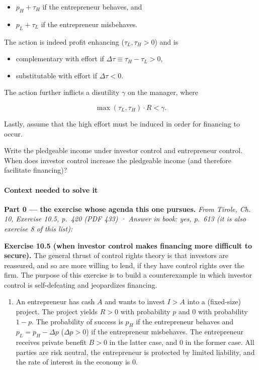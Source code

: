 \documentclass[11pt,a4paper]{article}
\providecommand{\tightlist}{\setlength{\itemsep}{0pt}\setlength{\parskip}{0pt}}
\begin{document}
\begin{itemize}
\tightlist
\item
  \(p_H + \tau_H\) if the entrepreneur behaves, and
\item
  \(p_L + \tau_L\) if the entrepreneur misbehaves.
\end{itemize}

The action is indeed profit enhancing (\(\tau_L, \tau_H > 0\)) and is

\begin{itemize}
\tightlist
\item
  complementary with effort if \(\Delta\tau \equiv \tau_H - \tau_L > 0\),
\item
  substitutable with effort if \(\Delta\tau < 0\).
\end{itemize}

The action further inflicts a disutility \(\gamma\) on the manager, where

\[\max(\tau_L, \tau_H)\cdot R < \gamma.\]

Lastly, assume that the high effort must be induced in order for financing to occur.

Write the pledgeable income under investor control and entrepreneur control. When does investor
control increase the pledgeable income (and therefore facilitate financing)?

\paragraph{Context needed to solve it}

\textbf{Part 0 --- the exercise whose agenda this one pursues.} \emph{From Tirole, Ch. 10, Exercise
10.5, p.~420 (PDF 433) · Answer in book: yes, p.~613 (it is also exercise 8 of this list):}

\textbf{Exercise 10.5 (when investor control makes financing more difficult to secure).} The general
thrust of control rights theory is that investors are reassured, and so are more willing to lend, if
they have control rights over the firm. The purpose of this exercise is to build a counterexample in
which investor control is self-defeating and jeopardizes financing.

\begin{enumerate}
\def\labelenumi{(\roman{enumi})}
\tightlist
\item
  An entrepreneur has cash \(A\) and wants to invest \(I > A\) into a (fixed-size) project. The
  project yields \(R > 0\) with probability \(p\) and 0 with probability \(1-p\). The probability of
  success is \(p_H\) if the entrepreneur behaves and \(p_L = p_H - \Delta p\) (\(\Delta p > 0\)) if
  the entrepreneur misbehaves. The entrepreneur receives private benefit \(B > 0\) in the latter
  case, and 0 in the former case. All parties are risk neutral, the entrepreneur is protected by
  limited liability, and the rate of interest in the economy is 0.
\end{enumerate}
\end{document}
